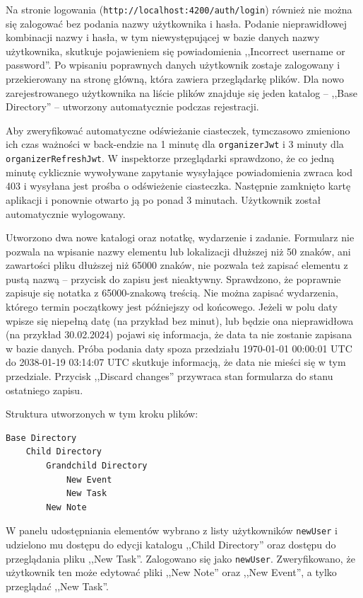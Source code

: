 \documentclass[a4paper,twoside,12pt]{book}
\begin{document}
Na stronie logowania (\texttt{http://localhost:4200/auth/login}) również nie można się zalogować bez podania nazwy użytkownika i hasła. Podanie nieprawidłowej kombinacji nazwy i hasła, w tym niewystępującej w bazie danych nazwy użytkownika, skutkuje pojawieniem się powiadomienia ,,Incorrect username or password''. Po wpisaniu poprawnych danych użytkownik zostaje zalogowany i przekierowany na stronę główną, która zawiera przeglądarkę plików. Dla nowo zarejestrowanego użytkownika na liście plików znajduje się jeden katalog -- ,,Base Directory'' -- utworzony automatycznie podczas rejestracji.

Aby zweryfikować automatyczne odświeżanie ciasteczek, tymczasowo zmieniono ich czas ważności w back-endzie na 1 minutę dla \texttt{organizerJwt} i 3 minuty dla \texttt{organizerRefreshJwt}. W inspektorze przeglądarki sprawdzono, że co jedną minutę cyklicznie wywoływane zapytanie wysyłające powiadomienia zwraca kod 403 i wysyłana jest prośba o odświeżenie ciasteczka. Następnie zamknięto kartę aplikacji i ponownie otwarto ją po ponad 3 minutach. Użytkownik został automatycznie wylogowany.

Utworzono dwa nowe katalogi oraz notatkę, wydarzenie i zadanie. Formularz nie pozwala na wpisanie nazwy elementu lub lokalizacji dłuższej niż 50 znaków, ani zawartości pliku dłuższej niż 65000 znaków, nie pozwala też zapisać elementu z pustą nazwą -- przycisk do zapisu jest nieaktywny. Sprawdzono, że poprawnie zapisuje się notatka z 65000-znakową treścią. Nie można zapisać wydarzenia, którego termin początkowy jest późniejszy od końcowego. Jeżeli w polu daty wpisze się niepełną datę (na przykład bez minut), lub będzie ona nieprawidłowa (na przykład 30.02.2024) pojawi się informacja, że data ta nie zostanie zapisana w bazie danych. Próba podania daty spoza przedziału 1970-01-01 00:00:01 UTC do 2038-01-19 03:14:07 UTC skutkuje informacją, że data nie mieści się w tym przedziale. Przycisk ,,Discard changes'' przywraca stan formularza do stanu ostatniego zapisu.

Struktura utworzonych w tym kroku plików:
\begin{verbatim}
Base Directory
	Child Directory
		Grandchild Directory
			New Event
			New Task
		New Note
\end{verbatim}

W panelu udostępniania elementów wybrano z listy użytkowników \texttt{newUser} i udzielono mu dostępu do edycji katalogu ,,Child Directory'' oraz dostępu do przeglądania pliku ,,New Task''. Zalogowano się jako \texttt{newUser}. Zweryfikowano, że użytkownik ten może edytować pliki ,,New Note'' oraz ,,New Event'', a tylko przeglądać ,,New Task''.
\end{document}
